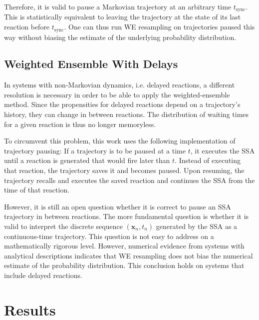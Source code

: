 \documentclass[english,letterpaper,12pt]{report}
\renewcommand{\vec}[1]{\ensuremath{\mathbf{#1}}}
\begin{document}
\begin{doublespacing}
Therefore, it is valid to pause a Markovian trajectory at an arbitrary time $t_\text{sync}$. This is statistically equivalent to leaving the trajectory at the state of its last reaction before $t_\text{sync}$. One can thus run WE resampling on trajectories paused this way without biasing the estimate of the underlying probability distribution.


\section{Weighted Ensemble With Delays} %
\label{sub:we-delays}

In systems with non-Markovian dynamics, i.e. delayed reactions, a different resolution is necessary in order to be able to apply the weighted-ensemble method. Since the propensities for delayed reactions depend on a trajectory's history, they can change in between reactions. The distribution of waiting times for a given reaction is thus no longer memoryless.

To circumvent this problem, this work uses the following implementation of trajectory pausing: If a trajectory is to be paused at a time $t$, it executes the SSA until a reaction is generated that would fire later than $t$. Instead of executing that reaction, the trajectory saves it and becomes paused. Upon resuming, the trajectory recalls and executes the saved reaction and continues the SSA from the time of that reaction.

However, it is still an open question whether it is correct to pause an SSA trajectory in between reactions. The more fundamental question is whether it is valid to interpret the discrete sequence $(\vec{x}_n, t_n)$ generated by the SSA as a continuous-time trajectory. This question is not easy to address on a mathematically rigorous level. However, numerical evidence from systems with analytical descriptions indicates that WE resampling does not bias the numerical estimate of the probability distribution. This conclusion holds on systems that include delayed reactions.



\chapter{Results} %
\label{chp:results}


\end{doublespacing}
\end{document}
